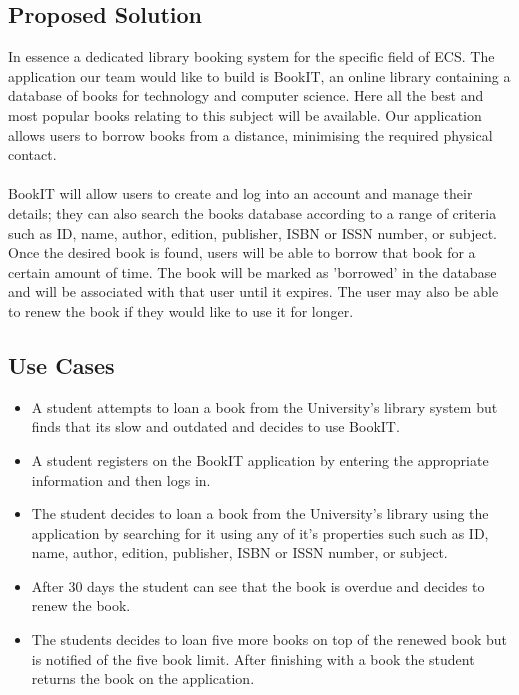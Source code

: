 \documentclass{article}
\begin{document}
\subsection{Proposed Solution}
In essence a dedicated library booking system for the specific field of ECS. The application our team would like to build is BookIT, an online library containing a database of books for technology and computer science. Here all the best and most popular books relating to this subject will be available. Our application allows users to borrow books from a distance, minimising the required physical contact.
\\\\
BookIT will allow users to create and log into an account and manage their details; they can also search the books database according to a range of criteria such as ID, name, author, edition, publisher, ISBN or ISSN number, or subject. Once the desired book is found, users will be able to borrow that book for a certain amount of time. The book will be marked as 'borrowed' in the database and will be associated with that user until it expires. The user may also be able to renew the book if they would like to use it for longer.

\subsection{Use Cases}
\begin{itemize}
  \item A student attempts to loan a book from the University's library system but finds that its slow and outdated and decides to use BookIT.
  \item A student registers on the BookIT application by entering the appropriate information and then logs in.
  \item The student decides to loan a book from the University's library using the application by searching for it using any of it's properties such such as ID, name, author, edition, publisher, ISBN or ISSN number, or subject.
  \item After 30 days the student can see that the book is overdue and decides to renew the book.
  \item The students decides to loan five more books on top of the renewed book but is notified of the five book limit.
  \Item After finishing with a book the student returns the book on the application.
\end{itemize}

\clearpage
\end{document}
